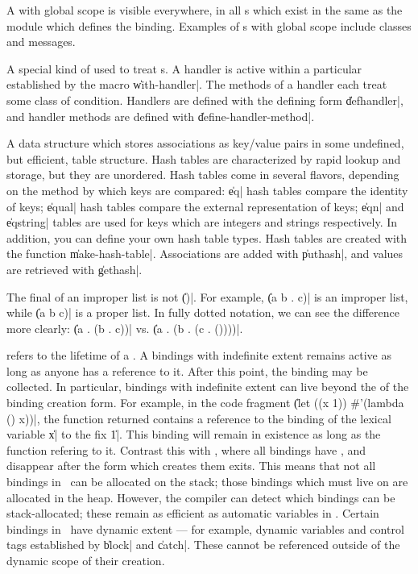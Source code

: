 \begin{description}
	{A  with global scope is visible everywhere, in
	all s which exist in the same 
	as the module which defines the binding.  Examples of
	s with global scope include classes and
	messages.}

	{A special kind of  used to treat
	s.  A handler is active within a particular
	 established by the macro \|with-handler|.
	The methods of a handler each treat some class of condition.
	Handlers are defined with the defining form \|defhandler|, and
	handler methods are defined with \|define-handler-method|.}

	{A data structure which stores associations as key/value pairs
	in some undefined, but efficient, table structure.  Hash
	tables are characterized by rapid lookup and storage, but they
	are unordered.  Hash tables come in several flavors, depending
	on the method by which keys are compared: \|eq| hash tables
	compare the identity of keys; \|equal| hash tables compare the
	external representation of keys; \|eqn| and \|eqstring| tables
	are used for keys which are integers and strings respectively.
	In addition, you can define your own hash table types.  Hash
	tables are created with the function \|make-hash-table|.
	Associations are added with \|puthash|, and values are
	retrieved with \|gethash|.}

	{The final  of an improper list is not \|()|.  For
	example, \|(a b . c)| is an improper list, while \|(a b c)| is
	a proper list.  In fully dotted notation, we can see the
	difference more clearly: \|(a . (b . c))| vs. \|(a . (b . (c .
	())))|.}

	{ refers to the lifetime of a .
	A bindings with indefinite extent remains active as long as
	anyone has a reference to it.  After this point, the binding
	may be collected.  In particular, bindings with indefinite
	extent can live beyond the  of the binding
	creation form.  For example, in the code fragment \|(let ((x
	1)) \#'(lambda () x))|, the function returned contains a
	reference to the binding of the lexical variable \|x| to the
	fix \|1|.  This binding will remain in existence as long as
	the function refering to it.  Contrast this with \langc, where
	all bindings have , and disappear after
	the form which creates them exits.  This means that not all
	bindings in \Talk\ can be allocated on the stack; those
	bindings which must live on are allocated in the heap.
	However, the compiler can detect which bindings can be
	stack-allocated; these remain as efficient as automatic
	variables in \langc.  Certain bindings in \Talk\ have dynamic
	extent --- for example, dynamic variables and control tags
	established by \|block| and \|catch|.  These cannot be
	referenced outside of the dynamic scope of their creation.}


\end{description}
